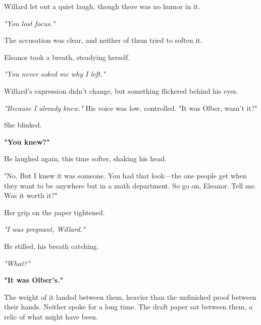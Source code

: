 \smallskip

Willard let out a quiet laugh, though there was no humor in it.

\smallskip

\textit{"You lost focus."}

\smallskip

The accusation was clear, and neither of them tried to soften it.

\smallskip

Eleanor took a breath, steadying herself.

\smallskip

\textit{"You never asked me why I left."}

\smallskip

\noindent
Willard’s expression didn’t change, but something flickered behind his eyes.

\smallskip

\textit{"Because I already knew."} His voice was low, controlled. "It was Olber, wasn’t it?"

\smallskip

She blinked.

\smallskip

\textbf{"You knew?"}

\smallskip

He laughed again, this time softer, shaking his head.

\smallskip

"No. But I knew it was someone. You had that look—the one people get when they want to be anywhere but in a math department. So go on, Eleanor. Tell me. Was it worth it?"

\smallskip

Her grip on the paper tightened.

\smallskip

\textit{"I was pregnant, Willard."}

\smallskip

He stilled, his breath catching.

\smallskip

\textit{"What?"}

\smallskip

\textbf{"It was Olber’s."}

\smallskip

The weight of it landed between them, heavier than the unfinished proof between their hands. Neither spoke for a long time. The draft paper sat between them, a relic of what might have been.

\smallskip

